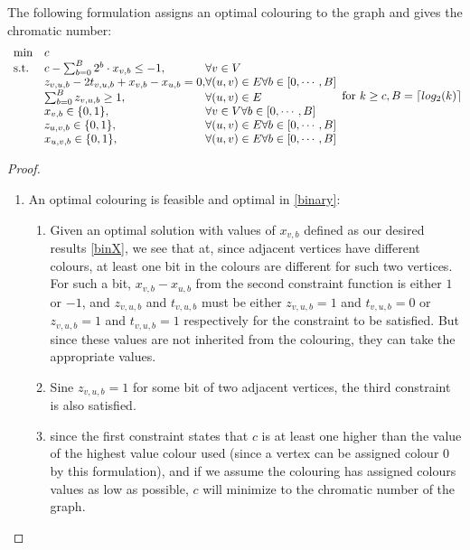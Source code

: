 \begin{proposition}
The following formulation assigns an optimal colouring to the graph and gives the chromatic number:
\begin{align}\label{binary}
\begin{array}{ll@{}ll}
\text{min} &c&\\
\text{s.t.} 
&c - \sum_{b = 0}^{B}{2^b\cdot x_{v,b}} \leq -1,& \forall v\in V\\
&z_{v,u,b}-2t_{v,u,b}+x_{v,b}-x_{u,b} = 0,& \forall (u,v)\in E \forall b \in [0,\cdots ,B ] \\
&\sum_{b = 0}^{B}{z_{v,u,b}} \geq 1,& \forall (u,v) \in E\\
&x_{v,b}\in\{0,1\},& \forall v \in V \forall b \in [0,\cdots ,B]\\
&z_{u,v,b}\in\{0,1\},& \forall (u,v) \in E \forall b \in [0,\cdots ,B]\\
&x_{u,v,b}\in\{0,1\},& \forall (u,v) \in E \forall b \in [0,\cdots ,B]\\
\end{array}
\text{for } k \geq c , B = \left \lceil{log_2(k)}\right \rceil
\end{align}
\begin{proof}
\begin{enumerate}
\item An optimal colouring is feasible and optimal in \ref{binary}:\\
\begin{enumerate}
\item Given an optimal solution with values of $x_{v,b}$ defined as our desired results \ref{binX}, we see that at, since adjacent vertices have different colours, at least one bit in the colours are different for such two vertices.\\
For such a bit, $x_{v,b}-x_{u,b}$ from the second constraint function is either $1$ or $-1$, and $z_{v,u,b}$ and $t_{v,u,b}$ must be either $z_{v,u,b} = 1$ and $t_{v,u,b} = 0$ or $z_{v,u,b} = 1$ and $t_{v,u,b} = 1$ respectively for the constraint to be satisfied. But since these values are not inherited from the colouring, they can take the appropriate values. 
\item Sine $z_{v,u,b} = 1$ for some bit of two adjacent vertices, the third constraint is also satisfied.
\item since the first constraint states that $c$ is at least one higher than the value of the highest value colour used (since a vertex can be assigned colour $0$ by this formulation), and if we assume the colouring has assigned colours values as low as possible, $c$ will minimize to the chromatic number of the graph.

\end{enumerate}
\end{enumerate}
\end{proof}
\end{proposition}
